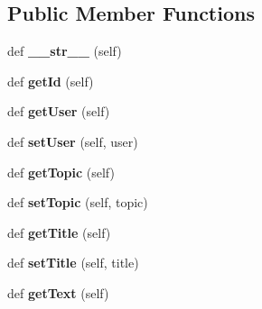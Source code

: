\subsection*{Public Member Functions}
\begin{DoxyCompactItemize}
\item 
\mbox{\label{classforum_1_1models_1_1_post_ae911a766cbe23e0c0041092224d09a63}} 
def {\bfseries \+\_\+\+\_\+str\+\_\+\+\_\+} (self)
\item 
\mbox{\label{classforum_1_1models_1_1_post_ac66c70e3f291c4aa03bd7ff2fdbe7190}} 
def {\bfseries get\+Id} (self)
\item 
\mbox{\label{classforum_1_1models_1_1_post_a6630f65f8c29ec2c1e756b977a697ccb}} 
def {\bfseries get\+User} (self)
\item 
\mbox{\label{classforum_1_1models_1_1_post_a7aec5985e0901f53a742e1c12b4718c5}} 
def {\bfseries set\+User} (self, user)
\item 
\mbox{\label{classforum_1_1models_1_1_post_a0ad30b082aa369d360638760dd01b7ea}} 
def {\bfseries get\+Topic} (self)
\item 
\mbox{\label{classforum_1_1models_1_1_post_a436d5291230c3ac2c80b626acaac3def}} 
def {\bfseries set\+Topic} (self, topic)
\item 
\mbox{\label{classforum_1_1models_1_1_post_a2129b87c5ef7c3b0bfe8cfd90e7eab40}} 
def {\bfseries get\+Title} (self)
\item 
\mbox{\label{classforum_1_1models_1_1_post_a0fe4659d6628e98176dee2d0f5507d09}} 
def {\bfseries set\+Title} (self, title)
\item 
\mbox{\label{classforum_1_1models_1_1_post_a848539ab65ee76026fa841639f8e3e17}} 
def {\bfseries get\+Text} (self)
\item 
\mbox{\label{classforum_1_1models_1_1_post_a6ed944073a41cc1961f7ed815cc60c24}} 

\end{DoxyCompactItemize}
